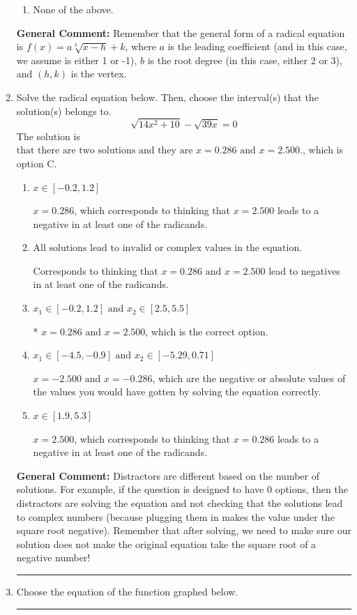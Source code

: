\documentclass{extbook}[14pt]
\newcommand{\litem}[1]{\item #1

\rule{\textwidth}{0.4pt}}
\begin{document}
\begin{enumerate}
{\begin{enumerate}[label=\Alph*.]
\begin{multicols}{2}
\end{multicols}\item None of the above.\end{enumerate}
\textbf{General Comment:} Remember that the general form of a radical equation is $ f(x) = a \sqrt[b]{x - h} + k $, where $a$ is the leading coefficient (and in this case, we assume is either 1 or -1), $b$ is the root degree (in this case, either 2 or 3), and $(h, k)$ is the vertex.
}
\litem{
Solve the radical equation below. Then, choose the interval(s) that the solution(s) belongs to.
\[ \sqrt{14 x^2 + 10} - \sqrt{39 x} = 0 \]The solution is \( \text{that there are two solutions and they are } x = 0.286 \text{ and } x = 2.500. \), which is option C.\begin{enumerate}[label=\Alph*.]
\item \( x \in [-0.2,1.2] \)

$x = 0.286$, which corresponds to thinking that $x = 2.500$ leads to a negative in at least one of the radicands.
\item \( \text{All solutions lead to invalid or complex values in the equation.} \)

Corresponds to thinking that $x = 0.286 \text{ and } x = 2.500$ lead to negatives in at least one of the radicands.
\item \( x_1 \in [-0.2, 1.2] \text{ and } x_2 \in [2.5,5.5] \)

* $x = 0.286 \text{ and } x = 2.500$, which is the correct option.
\item \( x_1 \in [-4.5, -0.9] \text{ and } x_2 \in [-5.29,0.71] \)

$x = -2.500 \text{ and } x = -0.286$, which are the negative or absolute values of the values you would have gotten by solving the equation correctly.
\item \( x \in [1.9,5.3] \)

$x = 2.500$, which corresponds to thinking that $x = 0.286$ leads to a negative in at least one of the radicands.
\end{enumerate}

\textbf{General Comment:} Distractors are different based on the number of solutions. For example, if the question is designed to have 0 options, then the distractors are solving the equation and not checking that the solutions lead to complex numbers (because plugging them in makes the value under the square root negative). Remember that after solving, we need to make sure our solution does not make the original equation take the square root of a negative number!
}
\litem{
Choose the equation of the function graphed below.

}
\end{enumerate}
\end{document}
